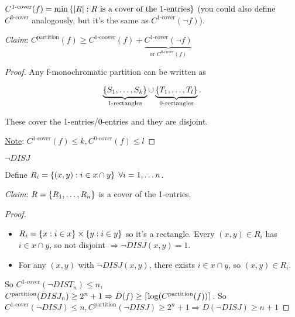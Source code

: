 \begin{definition}
    $C^{\text{1-cover}}(f) = \min\left \{ \left | R \right |: R \text{ is a cover of the 1-entries} \right \}$ (you could also define $C^{\text{0-cover}}$ analogously, but it's the same as $C^{\text{1-cover}}(\neg f)$).
\end{definition}

\emph{Claim}: $C^{\text{partition}}(f) \geq C^{\text{1-coover}}(f) + \underbrace{C^{\text{1-cover}}(\neg f)}_{\text{or } C^{\text{0-cover}}(f)}$

\begin{proof}
    Any f-monochromatic partition can be written as

    \begin{equation*}
        \underbrace{\left \{ S_1, \ldots, S_k \right \}}_{\text{1-rectangles}} \cup \underbrace{\left \{ T_1, \ldots, T_l \right \}}_{\text{0-rectangles}}.
    \end{equation*}

    These cover the 1-entries/0-entries and they are disjoint.

    \underline{Note}: $C^{\text{1-cover}}(f) \leq k, C^{\text{0-cover}}(f) \leq l$
\end{proof}

\begin{example}
    $\neg DISJ$
\end{example}

Define $R_i = \left \{ (x, y): i \in x \cap y \right \} \; \forall i = 1, \ldots n$.

\emph{Claim}: $R = \left \{ R_1, \ldots, R_n \right \}$ is a cover of the 1-entries.

\begin{proof}
    \begin{itemize}
        \item $R_i = \left \{ x: i \in x \right \} \times \left \{ y: i \in y \right \}$ so it's a rectangle. Every $(x, y) \in R_i$ has $i \in x \cap y$, so not disjoint $\Rightarrow \neg DISJ(x, y) = 1$.
        \item For any $(x, y)$ with $\neg DISJ(x, y)$, there exists $i \in x \cap y$, so $(x, y) \in R_i$.
    \end{itemize}

    So $C^{\text{1-cover}}(\neg DIST_n) \leq n$, $C^{\text{partition}}(DISJ_n) \geq 2^n + 1 \Rightarrow D(f) \geq \left \lceil \log(C^{\text{partition}}(f)) \right \rceil$. So $C^{\text{1-cover}}(\neg DISJ) \leq n, C^{\text{partition}}(\neg DISJ) \geq 2^n + 1 \Rightarrow D(\neg DISJ) \geq n + 1$
\end{proof}

